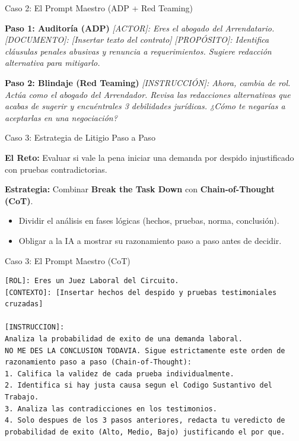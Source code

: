 \documentclass[aspectratio=169]{beamer}
\begin{document}
\begin{frame}[fragile]{Caso 2: El Prompt Maestro (ADP + Red Teaming)}


\textbf{Paso 1: Auditoría (ADP)}
\textit{[ACTOR]: Eres el abogado del Arrendatario.}
\textit{[DOCUMENTO]: [Insertar texto del contrato]}
\textit{[PROPÓSITO]: Identifica cláusulas penales abusivas y renuncia a requerimientos. Sugiere redacción alternativa para mitigarlo.}

\textbf{Paso 2: Blindaje (Red Teaming)}
\textit{[INSTRUCCIÓN]: Ahora, cambia de rol. Actúa como el abogado del Arrendador. Revisa las redacciones alternativas que acabas de sugerir y encuéntrales 3 debilidades jurídicas. ¿Cómo te negarías a aceptarlas en una negociación?}


\end{frame}



\begin{frame}[fragile]{Caso 3: Estrategia de Litigio Paso a Paso}


\textbf{El Reto:} Evaluar si vale la pena iniciar una demanda por despido injustificado con pruebas contradictorias.

\textbf{Estrategia:} Combinar \textbf{Break the Task Down} con \textbf{Chain-of-Thought (CoT)}.

\begin{itemize}
  \item Dividir el análisis en fases lógicas (hechos, pruebas, norma, conclusión).
  \item Obligar a la IA a mostrar su razonamiento paso a paso antes de decidir.
\end{itemize}
\end{frame}



\begin{frame}[fragile]{Caso 3: El Prompt Maestro (CoT)}


\begin{lstlisting}[basicstyle=\ttfamily\scriptsize]
[ROL]: Eres un Juez Laboral del Circuito.
[CONTEXTO]: [Insertar hechos del despido y pruebas testimoniales cruzadas]

[INSTRUCCION]:
Analiza la probabilidad de exito de una demanda laboral.
NO ME DES LA CONCLUSION TODAVIA. Sigue estrictamente este orden de razonamiento paso a paso (Chain-of-Thought):
1. Califica la validez de cada prueba individualmente.
2. Identifica si hay justa causa segun el Codigo Sustantivo del Trabajo.
3. Analiza las contradicciones en los testimonios.
4. Solo despues de los 3 pasos anteriores, redacta tu veredicto de probabilidad de exito (Alto, Medio, Bajo) justificando el por que.
\end{lstlisting}

\end{frame}
\end{document}
